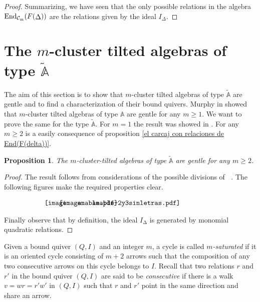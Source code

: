 \documentclass{amsart}
\theoremstyle{plain}
\newtheorem{prop}[teo]{Proposition}
\theoremstyle{definition}
\begin{document}
\begin{proof}
 Summarizing,  we have seen that the only possible relations in the  algebra ${\mathop{\rm End_{\mathcal{C}_m}}\nolimits}(F({\mathop{\Delta}\nolimits}))$ are the relations given by the ideal  $I_{\Delta}$.
\end{proof}

\section{The  $m$-cluster tilted algebras of type $\tilde{\mathbb{A}}$}

The aim of this section  is to show that  $m$-cluster tilted algebras of type $\tilde{\mathbb{A}}$ are gentle and to find a  characterization of their bound quivers.
Murphy in  \cite{Murphy2010} showed that   $m$-cluster tilted algebras of type $\mathbb{A}$ are gentle for any   $m\geq 1$. We want to prove the same for the  type  $\tilde{\mathbb{A}}$. For $m=1$   the result was showed in  \cite{ABCP09}. For any $m\geq 2$ is a easily consequence of proposition \ref{el carcaj con relaciones de End(F(delta))}.

\begin{prop}\label{son amables} The $m$-cluster-tilted algebras of type $\tilde{\mathbb{A}}$    are gentle for any $m\geq 2$.
\end{prop}

\begin{proof}  The result follows from considerations of the possible divisions of ${\mathop{P_{p,q,m}}\nolimits}$.  The following figures make the required properties clear.

\vspace*{-.2cm}

\vspace*{-.4cm}
 $$ \begin{array}{cc}
    \hspace*{-1.8cm} \texttt{[image: amable.pdf]} & \hspace*{-3.3cm}\texttt{[image: amable-2y3sinletras.pdf]} \\
\end{array}$$

\vspace*{-.8cm}
Finally observe that by definition,  the ideal $I_{\mathop{\Delta}\nolimits}$ is generated by monomial quadratic relations.
\end{proof}

Given a bound quiver $(Q,I)$ and an integer $m$, a cycle is called \emph{ $m$-saturated} if it is an oriented cycle consisting of $m+2$ arrows such that the composition of any two consecutive arrows on this cycle belongs to $I$. Recall that two relations  $r$ and $r'$ in the bound quiver $(Q,I)$ are said to be   \textit{consecutive} if there is a walk  $v=wr=r'w'$ in  $(Q,I)$ such that $r$ and $r'$ point in the same direction and share an arrow.\\
\end{document}
